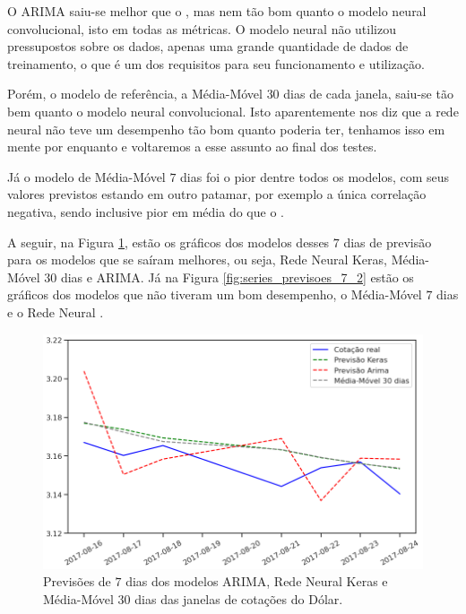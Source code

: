 O ARIMA saiu-se melhor que o , mas nem tão bom quanto o modelo neural convolucional, isto em todas as métricas. O modelo neural não utilizou pressupostos sobre os dados, apenas uma grande quantidade de dados de treinamento, o que é um dos requisitos para seu funcionamento e utilização.

Porém, o modelo de referência, a Média-Móvel $30$ dias de cada janela, saiu-se tão bem quanto o modelo neural convolucional. Isto aparentemente nos diz que a rede neural não teve um desempenho tão bom quanto poderia ter, tenhamos isso em mente por enquanto e voltaremos a esse assunto ao final dos testes.

Já o modelo de Média-Móvel $7$ dias foi o pior dentre todos os modelos, com seus valores previstos estando em outro patamar, por exemplo a única correlação negativa, sendo inclusive pior em média do que o .

A seguir, na Figura \ref{fig:series_previsoes_7_1}, estão os gráficos dos modelos desses $7$ dias de previsão para os modelos que se saíram melhores, ou seja, Rede Neural Keras, Média-Móvel $30$ dias e ARIMA. Já na Figura \ref{fig:series_previsoes_7_2} estão os gráficos dos modelos que não tiveram um bom desempenho, o Média-Móvel $7$ dias e o Rede Neural .

\begin{figure}[htb]
\centering
\includegraphics[width=13.1cm]{figuras/series_previsoes_7_1}
\caption{Previsões de $7$ dias dos modelos ARIMA, Rede Neural Keras e Média-Móvel $30$ dias das janelas de cotações do Dólar.}
\label{fig:series_previsoes_7_1}
\end{figure}

